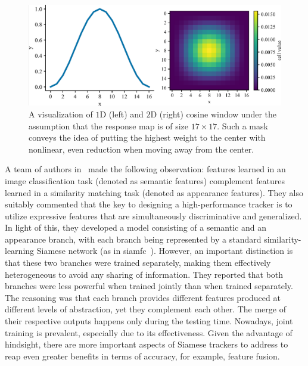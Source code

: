 \begin{figure}[!t]
    \centerline{\includegraphics[width=0.8\linewidth]{figures/theoretical_foundations/cosine_window.pdf}}
    \caption[Cosine window]{A visualization of $1$D (left) and $2$D (right) cosine window under the assumption that the response map is of size $17 \times 17$. Such a mask conveys the idea of putting the highest weight to the center with nonlinear, even reduction when moving away from the center.}
    \label{fig:CosineWindow}
\end{figure}

A team of authors in~\cite{he2018twofoldsiam} made the following observation: features learned in an image classification task (denoted as semantic features) complement features learned in a similarity matching task (denoted as appearance features). They also suitably commented that the key to designing a high-performance tracker is to utilize expressive features that are simultaneously discriminative and generalized. In light of this, they developed a model consisting of a semantic and an appearance branch, with each branch being represented by a standard similarity-learning Siamese network (as in \gls{siamfc}~\cite{bertinetto2016siamfc}). However, an important distinction is that these two branches were trained separately, making them effectively heterogeneous to avoid any sharing of information. They reported that both branches were less powerful when trained jointly than when trained separately. The reasoning was that each branch provides different features produced at different levels of abstraction, yet they complement each other. The merge of their respective outputs happens only during the testing time. Nowadays, joint training is prevalent, especially due to its effectiveness. Given the advantage of hindsight, there are more important aspects of Siamese trackers to address to reap even greater benefits in terms of accuracy, for example, feature fusion.

